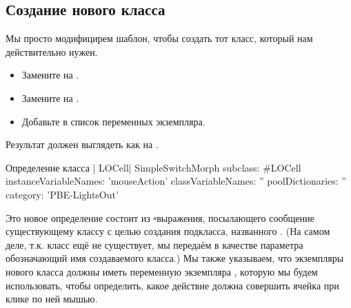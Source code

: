 \documentclass[a4paper,10pt,twoside]{book}
\begin{document}
\subsection{Создание нового класса}

Мы просто модифицирем шаблон, чтобы создать тот класс, который нам действительно нужен.

\begin{itemize}
  \item Замените  на .
  \item Замените  на .
  \item Добавьте  в список переменных экземпляра.
\end{itemize}
Результат должен выглядеть как на .

\begin{classdef}[firstClassDef]{Определение класса \ct| LOCell|}
SimpleSwitchMorph subclass: #LOCell
   instanceVariableNames: 'mouseAction'
   classVariableNames: ''
   poolDictionaries: ''
   category: 'PBE-LightsOut'
\end{classdef}

Это новое определение состоит из \st-выражения, посылающего сообщение существующему классу  с целью создания подкласса, названного .
(На самом деле, т.к. класс  ещё не существует, мы передаём в качестве параметра   обозначающий имя создаваемого класса.)
Мы также указываем, что экземпляры нового класса должны иметь переменную экземпляра , которую мы будем использовать, чтобы определить, какое действие должна совершить ячейка при клике по ней мышью.
\end{document}
